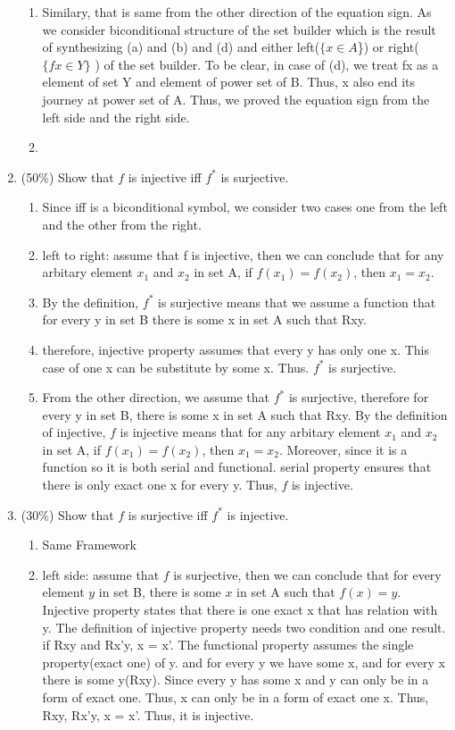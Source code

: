 \documentclass[10pt]{article}
\begin{document}
\begin{enumerate}
\begin{enumerate}
    \item Similary, that is same from the other direction of the equation sign. As we consider biconditional structure of the set builder which is the result of synthesizing (a) and (b) and (d) and either left($\{x \in A$\}) or right($\{f x \in Y\}$ ) of the set builder. To be clear, in case of (d), we treat fx as a element of set Y and element of power set of B. Thus, x also end its journey at power set of A. Thus, we proved the equation sign from the left side and the right side.
    \item 
  \end{enumerate}
  \item (50\%) Show that $f$ is injective iff $f^{*}$ is surjective.
  \begin{enumerate}
    \item Since iff is a biconditional symbol, we consider two cases one from the left and the other from the right. 
    \item left to right: assume that f is injective, then we can conclude that for any arbitary element $x_{1}$ and $x_{2}$ in set A, if $f(x_{1})=f(x_{2})$, then $x_{1}=x_{2}$.
    \item By the definition, $f^{*}$ is surjective means that we assume a function that for every y in set B there is some x in set A such that Rxy.
    \item therefore, injective property assumes that every y has only one x. This case of one x can be substitute by some x. Thus. $f^{*}$ is surjective.
    \item From the other direction, we assume that $f^{*}$ is surjective, therefore for every y in set B, there is some x in set A such that Rxy. By the definition of injective, 
    $f$ is injective means that for any arbitary element $x_{1}$ and $x_{2}$ in set A, if $f(x_{1})=f(x_{2})$, then $x_{1}=x_{2}$. Moreover, since it is a function so it is both serial and functional. serial property ensures that there is only exact one x for every y. Thus, $f$ is injective.
  \end{enumerate}
  \item (30\%) Show that $f$ is surjective iff $f^{*}$ is injective. 
  \begin{enumerate}
    \item Same Framework
    \item left side: assume that $f$ is surjective, then we can conclude that for every element $y$ in set B, there is some $x$ in set A such that $f(x)=y$. Injective property states that there is one exact x that has relation with y. The definition of injective property needs two condition and one result. if Rxy and Rx'y, x = x'. The functional property assumes the single property(exact one) of y. and for every y we have some x, and for every x there is some y(Rxy). Since every y has some x and y can only be in a form of exact one. Thus, x can only be in a form of exact one x. Thus, Rxy, Rx'y, x = x'. Thus, it is injective. 

\end{enumerate}
\end{enumerate}
\end{document}
